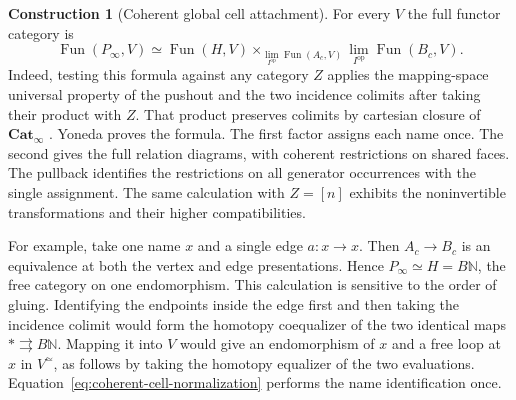 \documentclass[oneside]{article}
\theoremstyle{plain}
\theoremstyle{definition}
\newtheorem{construction}[theorem]{Construction}
\theoremstyle{remark}
\newcommand{\Cat}{\mathbf{Cat}_{\infty}}
\newcommand{\Fun}{\operatorname{Fun}}
\newcommand{\core}{\simeq}
\newcommand{\op}{\mathrm{op}}
\begin{document}
\begin{construction}[Coherent global cell attachment]
For every $V$ the full functor category is
\begin{equation}\label{eq:normalized-cell-mapping}
 \Fun(P_\infty,V)\simeq
 \Fun(H,V)\mathop{\times}_{\lim_{I^{\op}}\Fun(A_c,V)}
                    \lim_{I^{\op}}\Fun(B_c,V).
\end{equation}
Indeed, testing this formula against any category $Z$ applies the
mapping-space universal property of the pushout and the two incidence
colimits after taking their product with $Z$. That product preserves
colimits by cartesian closure of $\Cat$
\cite[Ex.~7.7.3.11]{Kerodon}. Yoneda proves the formula. The first
factor assigns each name once. The second gives the full relation
diagrams, with coherent restrictions on shared faces. The pullback
identifies the restrictions on all generator occurrences with the
single assignment. The same calculation with $Z=[n]$ exhibits the
noninvertible transformations and their higher compatibilities.

For example, take one name $x$ and a single edge $a:x\to x$. Then
$A_c\to B_c$ is an equivalence at both the vertex and edge
presentations. Hence $P_\infty\simeq H=B\mathbb N$, the free category
on one endomorphism. This calculation is sensitive to the order of
gluing. Identifying the endpoints inside the edge first and then taking
the incidence colimit would form the homotopy coequalizer of the two
identical maps $*\rightrightarrows B\mathbb N$. Mapping it into $V$
would give an endomorphism of $x$ and a free loop at $x$ in $V^\core$,
as follows by taking the homotopy equalizer of the two evaluations.
Equation~\eqref{eq:coherent-cell-normalization} performs the
name identification once.
\end{construction}
\end{document}

